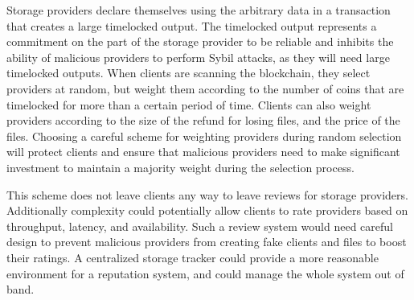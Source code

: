 \documentclass[twocolumn]{article}
\begin{document}
Storage providers declare themselves using the arbitrary data in a transaction that creates a large timelocked output.
The timelocked output represents a commitment on the part of the storage provider to be reliable and inhibits the ability of malicious providers to perform Sybil attacks, as they will need large timelocked outputs.
When clients are scanning the blockchain, they select providers at random, but weight them according to the number of coins that are timelocked for more than a certain period of time.
Clients can also weight providers according to the size of the refund for losing files, and the price of the files.
Choosing a careful scheme for weighting providers during random selection will protect clients and ensure that malicious providers need to make significant investment to maintain a majority weight during the selection process.

This scheme does not leave clients any way to leave reviews for storage providers.
Additionally complexity could potentially allow clients to rate providers based on throughput, latency, and availability.
Such a review system would need careful design to prevent malicious providers from creating fake clients and files to boost their ratings.
A centralized storage tracker could provide a more reasonable environment for a reputation system, and could manage the whole system out of band.


\end{document}
